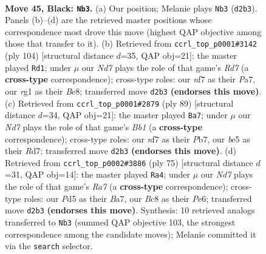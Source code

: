 \documentclass[11pt]{article}
\begin{document}
\clearpage

\begin{figure}[p]\centering
\begin{subfigure}{0.46\textwidth}\centering
\resizebox{\linewidth}{!}{%
\newchessgame
\chessboard[
  setfen={r1b5/5N1k/2P1p3/Pp1pB3/5K2/2P5/3n4/6R1 b - - 13 45},
  showmover=false,
  pgfstyle=straightmove, color=movearrow, markmove={d2-b3}
]}
\caption{}
\end{subfigure}\hfill
\begin{subfigure}{0.46\textwidth}\centering
\resizebox{\linewidth}{!}{%
\newchessgame
\chessboard[
  setfen={4B3/P2R4/4p2P/1Pp1k1K1/2P1b3/7r/1b6/8 w - - 13 53},
  showmover=false,
  pgfstyle=straightmove, color=movearrow, markmove={d7-d1}
]}
\caption{}
\end{subfigure}
\\[4pt]
\begin{subfigure}{0.46\textwidth}\centering
\resizebox{\linewidth}{!}{%
\newchessgame
\chessboard[
  setfen={1b4k1/1p1r4/4N1p1/p2p4/P5P1/1P6/1B4B1/7K b - - 0 45},
  showmover=false,
  pgfstyle=straightmove, color=movearrow, markmove={b8-a7}
]}
\caption{}
\end{subfigure}\hfill
\begin{subfigure}{0.46\textwidth}\centering
\resizebox{\linewidth}{!}{%
\newchessgame
\chessboard[
  setfen={8/b4p1k/4pn1p/8/4PP2/3R1B1P/r7/4BK2 b - - 0 38},
  showmover=false,
  pgfstyle=straightmove, color=movearrow, markmove={a2-a4}
]}
\caption{}
\end{subfigure}
\caption{\textbf{Move 45, Black: \texttt{Nb3}.} (a) Our position; Melanie plays \texttt{Nb3} (\texttt{d2b3}). Panels (b)--(d) are the retrieved master positions whose correspondence most drove this move (highest QAP objective among those that transfer to it). (b) Retrieved from \texttt{ccrl\_top\_p0001\#3142} (ply 104) [structural distance $d$=35, QAP obj=21]: the master played \texttt{Rd1}; under $\mu$ our \emph{Nd7} plays the role of that game's \emph{Rd7} (a \textbf{cross-type} correspondence); cross-type roles: our \emph{n}f7 as their \emph{P}a7, our \emph{r}g1 as their \emph{B}e8; transferred move \texttt{d2b3} \textbf{(endorses this move)}. (c) Retrieved from \texttt{ccrl\_top\_p0001\#2879} (ply 89) [structural distance $d$=34, QAP obj=21]: the master played \texttt{Ba7}; under $\mu$ our \emph{Nd7} plays the role of that game's \emph{Bb1} (a \textbf{cross-type} correspondence); cross-type roles: our \emph{n}f7 as their \emph{P}b7, our \emph{b}e5 as their \emph{R}d7; transferred move \texttt{d2b3} \textbf{(endorses this move)}. (d) Retrieved from \texttt{ccrl\_top\_p0002\#3886} (ply 75) [structural distance $d$=31, QAP obj=14]: the master played \texttt{Ra4}; under $\mu$ our \emph{Nd7} plays the role of that game's \emph{Ra7} (a \textbf{cross-type} correspondence); cross-type roles: our \emph{P}d5 as their \emph{B}a7, our \emph{B}c8 as their \emph{P}e6; transferred move \texttt{d2b3} \textbf{(endorses this move)}. Synthesis: 10 retrieved analogs transferred to \texttt{Nb3} (summed QAP objective 103, the strongest correspondence among the candidate moves); Melanie committed it via the \texttt{search} selector.}
\label{fig:thought-m89}
\end{figure}
\end{document}
